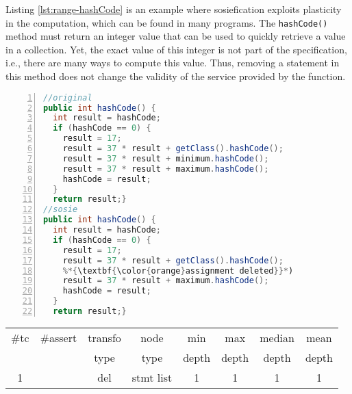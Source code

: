 Listing \ref{lst:range-hashCode} is an example where sosiefication exploits plasticity in the computation, which can be found in many programs. 
The \texttt{hashCode()} method must return an integer value that can be used to quickly retrieve a value in a collection. Yet, the exact value of this integer is not part of the specification, i.e., there are many ways to compute this value. 
Thus, removing a statement in this method does not change the validity of the service provided by the function. 

\begin{minipage}{\columnwidth}
\begin{lstlisting}[caption={\texttt{hashCode} in commons.lang and a sosie},label={lst:range-hashCode},language=java,numbers=left]
//original
public int hashCode() {
  int result = hashCode;
  if (hashCode == 0) {
    result = 17;
    result = 37 * result + getClass().hashCode();
    result = 37 * result + minimum.hashCode(); 
    result = 37 * result + maximum.hashCode();
    hashCode = result;
  }
  return result;}
//sosie
public int hashCode() {
  int result = hashCode;
  if (hashCode == 0) {
    result = 17;
    result = 37 * result + getClass().hashCode();
    %*{\textbf{\color{orange}assignment deleted}}*)
    result = 37 * result + maximum.hashCode();
    hashCode = result;
  }
  return result;}
\end{lstlisting}
\tabcolsep=0.11cm
\begin{tabular}{>{\small}c>{\small}c>{\small}c>{\small}c>{\small}c>{\small}c>{\small}c>{\small}c}
\hline
\rowcolor{lightgray} \#tc & \#assert & transfo & node & min & max & median & mean   \\
\rowcolor{lightgray}  & & type & type & depth  & depth & depth & depth  \\ 
\hline
1&  & del & stmt list &1  &1  &1  &1 \\
\hline
\end{tabular}
\end{minipage}